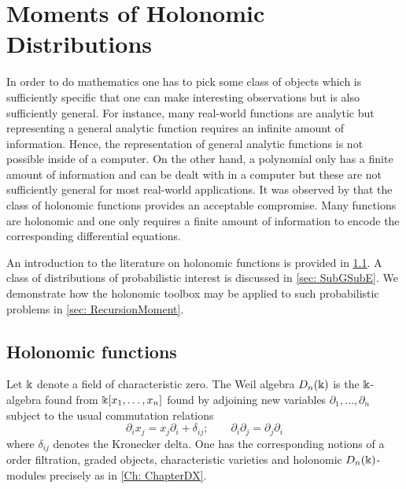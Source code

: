 \chapter{Moments of Holonomic Distributions}
In order to do mathematics one has to pick some class of objects which is sufficiently specific that one can make interesting observations but is also sufficiently general.
For instance, many real-world functions are analytic but representing a general analytic function requires an infinite amount of information.
Hence, the representation of general analytic functions is not possible inside of a computer.
On the other hand, a polynomial only has a finite amount of information and can be dealt with in a computer but these are not sufficiently general for most real-world applications.
It was observed by \cite{zeilberger1990holonomic} that the class of holonomic functions provides an acceptable compromise.
Many functions are holonomic and one only requires a finite amount of information to encode the corresponding differential equations.

An introduction to the literature on holonomic functions is provided in \cref{sec: HolAlgorithm}.
A class of distributions of probabilistic interest is discussed in \cref{sec: SubGSubE}.
We demonstrate how the holonomic toolbox may be applied to such probabilistic problems in \cref{sec: RecursionMoment}.
\section{Holonomic functions}\label{sec: HolAlgorithm}
Let $\Bbbk$ denote a field of characteristic zero.
The Weil algebra $D_n(\Bbbk)$ is the $\Bbbk$-algebra found from $\Bbbk[x_1,\ldots,x_n]$ found by adjoining new variables $\partial_1,\ldots,\partial_n$ subject to the usual commutation relations
$$\partial_i x_j = x_j \partial_i + \delta_{ij};\qquad \partial_i \partial_j = \partial_j \partial_i $$
where $\delta_{ij}$ denotes the Kronecker delta.
One has the corresponding notions of a order filtration, graded objects, characteristic varieties and holonomic $D_n(\Bbbk)$-modules precisely as in \cref{Ch: ChapterDX}.


